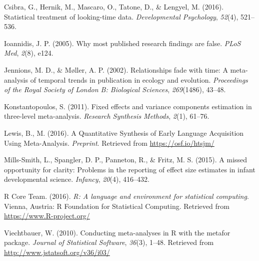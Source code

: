 \documentclass[english,floatsintext,man]{apa6}
\begin{document}
Csibra, G., Hernik, M., Mascaro, O., Tatone, D., \& Lengyel, M. (2016).
Statistical treatment of looking-time data. \emph{Developmental
Psychology}, \emph{52}(4), 521--536.

Ioannidis, J. P. (2005). Why most published research findings are false.
\emph{PLoS Med}, \emph{2}(8), e124.

Jennions, M. D., \& M{ø}ller, A. P. (2002). Relationships fade with
time: A meta-analysis of temporal trends in publication in ecology and
evolution. \emph{Proceedings of the Royal Society of London B:
Biological Sciences}, \emph{269}(1486), 43--48.

Konstantopoulos, S. (2011). Fixed effects and variance components
estimation in three-level meta-analysis. \emph{Research Synthesis
Methods}, \emph{2}(1), 61--76.

Lewis, B., M. (2016). A Quantitative Synthesis of Early Language
Acquisition Using Meta-Analysis. \emph{Preprint}. Retrieved from
\url{https://osf.io/htsjm/}

Mills-Smith, L., Spangler, D. P., Panneton, R., \& Fritz, M. S. (2015).
A missed opportunity for clarity: Problems in the reporting of effect
size estimates in infant developmental science. \emph{Infancy},
\emph{20}(4), 416--432.

R Core Team. (2016). \emph{R: A language and environment for statistical
computing}. Vienna, Austria: R Foundation for Statistical Computing.
Retrieved from \url{https://www.R-project.org/}

Viechtbauer, W. (2010). Conducting meta-analyses in R with the metafor
package. \emph{Journal of Statistical Software}, \emph{36}(3), 1--48.
Retrieved from \url{http://www.jstatsoft.org/v36/i03/}
\end{document}
